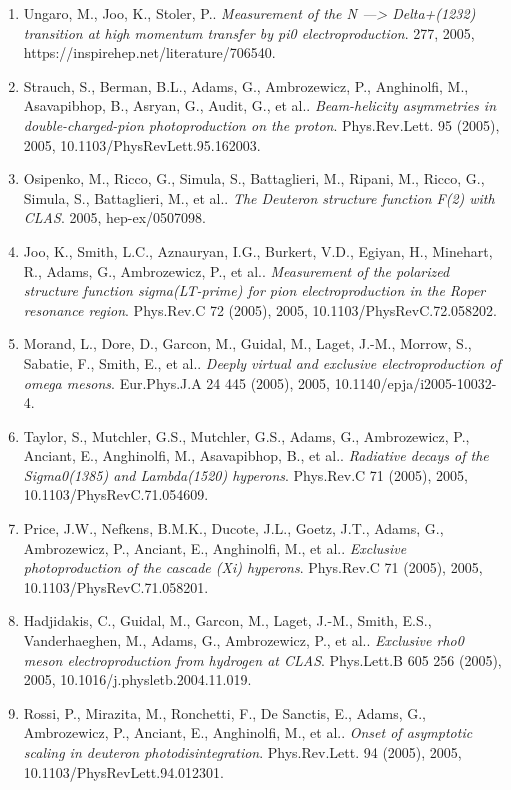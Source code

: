 \begin{enumerate}
\item Ungaro, M., Joo, K., Stoler, P.. \textit{Measurement of the N ---> Delta+(1232) transition at high momentum transfer by pi0 electroproduction}. 277, 2005, https://inspirehep.net/literature/706540.
\item Strauch, S., Berman, B.L., Adams, G., Ambrozewicz, P., Anghinolfi, M., Asavapibhop, B., Asryan, G., Audit, G., et al.. \textit{Beam-helicity asymmetries in double-charged-pion photoproduction on the proton}. Phys.Rev.Lett. 95 (2005), 2005, 10.1103/PhysRevLett.95.162003.
\item Osipenko, M., Ricco, G., Simula, S., Battaglieri, M., Ripani, M., Ricco, G., Simula, S., Battaglieri, M., et al.. \textit{The Deuteron structure function F(2) with CLAS}. 2005, hep-ex/0507098.
\item Joo, K., Smith, L.C., Aznauryan, I.G., Burkert, V.D., Egiyan, H., Minehart, R., Adams, G., Ambrozewicz, P., et al.. \textit{Measurement of the polarized structure function sigma(LT-prime) for pion electroproduction in the Roper resonance region}. Phys.Rev.C 72 (2005), 2005, 10.1103/PhysRevC.72.058202.
\item Morand, L., Dore, D., Garcon, M., Guidal, M., Laget, J.-M., Morrow, S., Sabatie, F., Smith, E., et al.. \textit{Deeply virtual and exclusive electroproduction of omega mesons}. Eur.Phys.J.A 24 445 (2005), 2005, 10.1140/epja/i2005-10032-4.
\item Taylor, S., Mutchler, G.S., Mutchler, G.S., Adams, G., Ambrozewicz, P., Anciant, E., Anghinolfi, M., Asavapibhop, B., et al.. \textit{Radiative decays of the Sigma0(1385) and Lambda(1520) hyperons}. Phys.Rev.C 71 (2005), 2005, 10.1103/PhysRevC.71.054609.
\item Price, J.W., Nefkens, B.M.K., Ducote, J.L., Goetz, J.T., Adams, G., Ambrozewicz, P., Anciant, E., Anghinolfi, M., et al.. \textit{Exclusive photoproduction of the cascade (Xi) hyperons}. Phys.Rev.C 71 (2005), 2005, 10.1103/PhysRevC.71.058201.
\item Hadjidakis, C., Guidal, M., Garcon, M., Laget, J.-M., Smith, E.S., Vanderhaeghen, M., Adams, G., Ambrozewicz, P., et al.. \textit{Exclusive rho0 meson electroproduction from hydrogen at CLAS}. Phys.Lett.B 605 256 (2005), 2005, 10.1016/j.physletb.2004.11.019.
\item Rossi, P., Mirazita, M., Ronchetti, F., De Sanctis, E., Adams, G., Ambrozewicz, P., Anciant, E., Anghinolfi, M., et al.. \textit{Onset of asymptotic scaling in deuteron photodisintegration}. Phys.Rev.Lett. 94 (2005), 2005, 10.1103/PhysRevLett.94.012301.

\end{enumerate}
